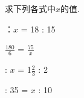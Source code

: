 求下列各式中$x$的值. 

\begin{subquestions}

      ：$x$ = 18 : 15 \hspace{3cm}

     \subquestion $\frac{180}{6}$ = $\frac{75}{x}$ 

      : $x$ = 1$\frac{2}{3}$ : 2 \hspace{3.4cm} 

      : 35 = $x$ : 10

\end{subquestions}





